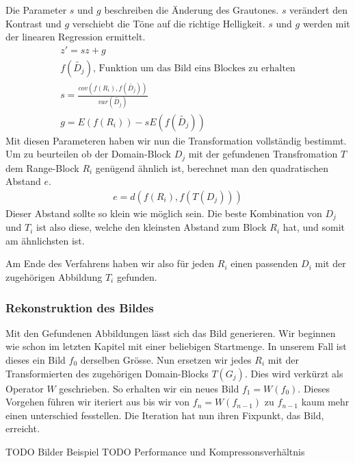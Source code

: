 Die Parameter $s$ und $g$ beschreiben die Änderung des Grautones. $s$ verändert den Kontrast und $g$ verschiebt die Töne auf die richtige Helligkeit. 
$s$ und $g$ werden mit der linearen Regression ermittelt. 
\begin{align*}
	z' = sz + g \\
	f(\tilde{D_j}) \text{, Funktion um das Bild eins Blockes zu erhalten}  \\
	s = \frac{cov(f(R_i), f(\tilde{D_j}))}{var(\tilde{D_j})} \\
	g = E(f(R_i)) - s E(f(\tilde{D_j}))
\end{align*}
Mit diesen Parameteren haben wir nun die Transformation vollständig bestimmt.
Um zu beurteilen ob der Domain-Block $D_j$ mit der gefundenen Transfromation $T$ dem Range-Block $R_i$ genügend ähnlich ist, berechnet man den quadratischen Abstand $e$.
\begin{align*}
	e = d(f(R_i), f(T(D_j)))
\end{align*}
Dieser Abstand sollte so klein wie möglich sein.
Die beste Kombination von $D_j$ und $T_i$ ist also diese, welche den kleinsten Abstand zum Block $R_i$ hat, und somit am ähnlichsten ist.

Am Ende des Verfahrens haben wir also für jeden $R_i$ einen passenden $D_i$ mit der zugehörigen Abbildung $T_i$ gefunden.

\subsubsection{Rekonstruktion des Bildes}
Mit den Gefundenen Abbildungen lässt sich das Bild generieren.
Wir beginnen wie schon im letzten Kapitel mit einer beliebigen Startmenge.
In unserem Fall ist dieses ein Bild  $f_0$ derselben Grösse.
Nun ersetzen wir jedes $R_i$ mit der Transformierten des zugehörigen Domain-Blocks $T(G_j)$.
Dies wird verkürzt als Operator $W$ geschrieben.
So erhalten wir ein neues Bild $f_1 = W(f_0)$.
Dieses Vorgehen führen wir iteriert aus bis wir von $f_n = W(f_{n-1})$ zu $f_{n-1}$ kaum mehr einen unterschied fesstellen. Die Iteration hat nun ihren Fixpunkt, das Bild, erreicht.

TODO Bilder Beispiel
TODO Performance und Kompressonsverhältnis
